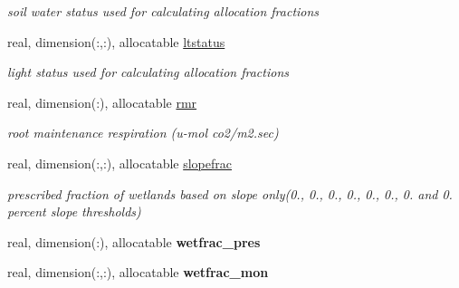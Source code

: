 \begin{DoxyCompactItemize}
\begin{DoxyCompactList}\small\item\em soil water status used for calculating allocation fractions \end{DoxyCompactList}\item 
\hypertarget{structctem__statevars_1_1veg__gat_a4042caf2c51ccb4baa1cccc129d30416}{}real, dimension(\+:,\+:), allocatable \hyperlink{structctem__statevars_1_1veg__gat_a4042caf2c51ccb4baa1cccc129d30416}{ltstatus}\label{structctem__statevars_1_1veg__gat_a4042caf2c51ccb4baa1cccc129d30416}

\begin{DoxyCompactList}\small\item\em light status used for calculating allocation fractions \end{DoxyCompactList}\item 
\hypertarget{structctem__statevars_1_1veg__gat_a75f5eb3bd289496bc0ddaec9672c6c5b}{}real, dimension(\+:), allocatable \hyperlink{structctem__statevars_1_1veg__gat_a75f5eb3bd289496bc0ddaec9672c6c5b}{rmr}\label{structctem__statevars_1_1veg__gat_a75f5eb3bd289496bc0ddaec9672c6c5b}

\begin{DoxyCompactList}\small\item\em root maintenance respiration (u-\/mol co2/m2.\+sec) \end{DoxyCompactList}\item 
\hypertarget{structctem__statevars_1_1veg__gat_adc5c7fa8fb8054fc5cfe0ea0851fe7fb}{}real, dimension(\+:,\+:), allocatable \hyperlink{structctem__statevars_1_1veg__gat_adc5c7fa8fb8054fc5cfe0ea0851fe7fb}{slopefrac}\label{structctem__statevars_1_1veg__gat_adc5c7fa8fb8054fc5cfe0ea0851fe7fb}

\begin{DoxyCompactList}\small\item\em prescribed fraction of wetlands based on slope only(0., 0., 0., 0., 0., 0., 0. and 0. percent slope thresholds) \end{DoxyCompactList}\item 
\hypertarget{structctem__statevars_1_1veg__gat_aa7a8f8aa3bde4a2877e36d9fad9716f0}{}real, dimension(\+:), allocatable {\bfseries wetfrac\+\_\+pres}\label{structctem__statevars_1_1veg__gat_aa7a8f8aa3bde4a2877e36d9fad9716f0}

\item 
\hypertarget{structctem__statevars_1_1veg__gat_a338ceedcbfbb4e76ca0f1c7734f450cd}{}real, dimension(\+:,\+:), allocatable {\bfseries wetfrac\+\_\+mon}\label{structctem__statevars_1_1veg__gat_a338ceedcbfbb4e76ca0f1c7734f450cd}


\end{DoxyCompactItemize}
